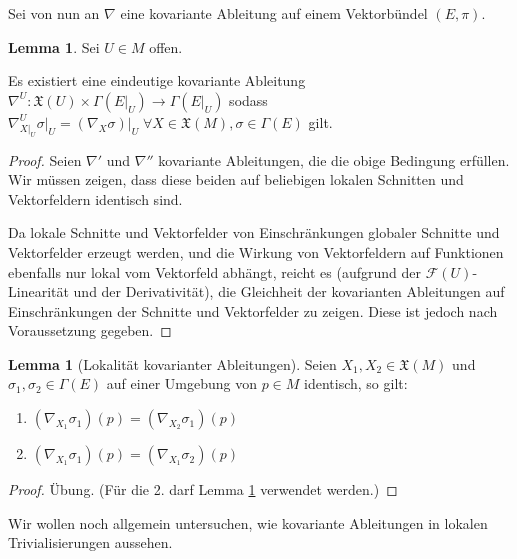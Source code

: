 \documentclass[a4paper]{scrreprt}
\numberwithin{equation}{chapter}
\newcommand{\sm}{\mathcal{F}}
\newcommand{\vf}{\mathfrak{X}}
\theoremstyle{definition}
\newtheorem{lemma}[defn]{Lemma}
\begin{document}
		Sei von nun an $\nabla$ eine kovariante Ableitung auf einem Vektorbündel $(E,\pi)$.
		\begin{lemma}\label{lemma:Einschränkung_kovarianter_Ableitungen}
			Sei $U\in M$ offen. 
			
			Es existiert eine eindeutige kovariante Ableitung $\nabla^U\colon\vf(U)\times\Gamma(E\vert_U)\rightarrow \Gamma(E\vert_U)$ sodass $\nabla^U_{X\vert_U}\sigma\vert_U=(\nabla_X\sigma)\vert_U\; \forall X\in\vf(M),\sigma\in\Gamma(E)$ gilt.
			\begin{proof}
				Seien $\nabla'$ und $\nabla''$ kovariante Ableitungen, die die obige Bedingung erfüllen. Wir müssen zeigen, dass diese beiden auf beliebigen lokalen Schnitten und Vektorfeldern identisch sind. 
				
				Da lokale Schnitte und Vektorfelder von Einschränkungen globaler Schnitte und Vektorfelder erzeugt werden, und die Wirkung von Vektorfeldern auf Funktionen ebenfalls nur lokal vom Vektorfeld abhängt, reicht es (aufgrund der $\sm(U)$-Linearität und der Derivativität), die Gleichheit der kovarianten Ableitungen auf Einschränkungen der Schnitte und Vektorfelder zu zeigen. Diese ist jedoch nach Voraussetzung gegeben.
			\end{proof}
		\end{lemma}
		\begin{lemma}[Lokalität kovarianter Ableitungen]
			Seien $X_1,X_2\in\vf(M)$ und $\sigma_1,\sigma_2\in\Gamma(E)$ auf einer Umgebung von $p\in M$ identisch, so gilt:
			\begin{enumerate}
				\item $\left(\nabla_{X_1}\sigma_1\right)(p)=\left(\nabla_{X_2}\sigma_1\right)(p)$
				\item $\left(\nabla_{X_1}\sigma_1\right)(p)=\left(\nabla_{X_1}\sigma_2\right)(p)$
			\end{enumerate}
			\begin{proof}
				Übung. (Für die 2. darf Lemma \ref{lemma:Einschränkung_kovarianter_Ableitungen} verwendet werden.)
			\end{proof}
		\end{lemma}
		Wir wollen noch allgemein untersuchen, wie kovariante Ableitungen in lokalen Trivialisierungen aussehen.
\end{document}
